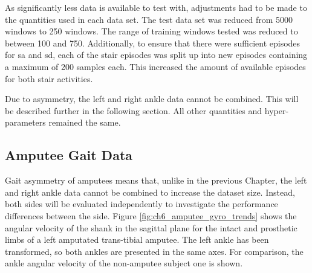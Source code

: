 As significantly less data is available to test with, adjustments had to be made to the quantities used in each data set. The test data set was reduced from 5000 windows to 250 windows. The range of training windows tested was reduced to between 100 and 750. Additionally, to ensure that there were sufficient episodes for \acrshort{sa} and \acrshort{sd}, each of the stair episodes was split up into new episodes containing a maximum of 200 samples each. This increased the amount of available episodes for both stair activities.

Due to asymmetry, the left and right ankle data cannot be combined. This will be described further in the following section. All other quantities and hyper-parameters remained the same.

\subsection{Amputee Gait Data}
Gait asymmetry of amputees means that, unlike in the previous Chapter, the left and right ankle data cannot be combined to increase the dataset size. Instead, both sides will be evaluated independently to investigate the performance differences between the side. Figure \ref{fig:ch6_amputee_gyro_trends} shows the angular velocity of the shank in the sagittal plane for the intact and prosthetic limbs of a left amputated trans-tibial amputee. The left ankle has been transformed, so both ankles are presented in the same axes. For comparison, the ankle angular velocity of the non-amputee subject one is shown.

